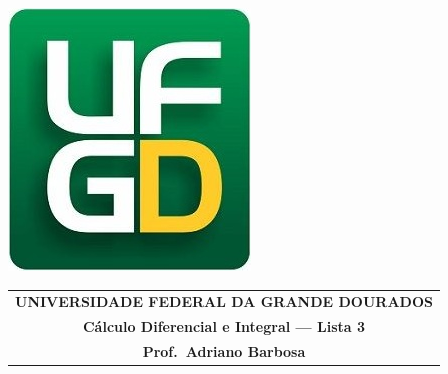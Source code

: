 \documentclass[a4paper,5pt]{amsbook}
\begin{document}
\thispagestyle{empty}
\pagestyle{empty}
\begin{minipage}[h]{0.14\textwidth}
	\includegraphics[scale=0.24]{../../ufgd.png}
\end{minipage}
\begin{minipage}[h]{\textwidth}
\begin{tabular}{c}
{{\bf UNIVERSIDADE FEDERAL DA GRANDE DOURADOS}}\\
{{\bf C\'alculo Diferencial e Integral --- Lista 3}}\\
{{\bf Prof.\ Adriano Barbosa}}\\
\end{tabular}
\vspace{-0.45cm}
%
\end{minipage}

\end{document}
